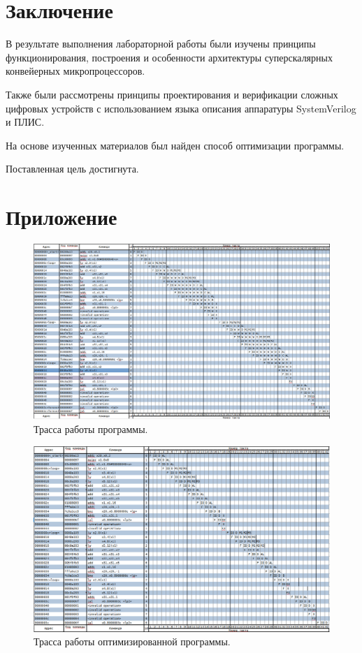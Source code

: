 \chapter*{Заключение}

В результате выполнения лабораторной работы были изучены принципы функционирования, построения и особенности архитектуры суперскалярных конвейерных микропроцессоров.

Также были рассмотрены принципы проектирования и верификации сложных цифровых устройств с использованием языка описания аппаратуры SystemVerilog и ПЛИС.

На основе изученных материалов был найден способ оптимизации программы.

Поставленная цель достигнута.

\chapter*{Приложение}

\begin{figure}[h]
	\centering
	\includegraphics[height=0.33\textheight]{img/t5-trasa-01}
	\caption{Трасса работы программы.}
\end{figure}

\begin{figure}[h]
	\centering
	\includegraphics[height=0.33\textheight]{img/t5-trasa-02}
	\caption{Трасса работы оптимизированной программы.}
\end{figure}

